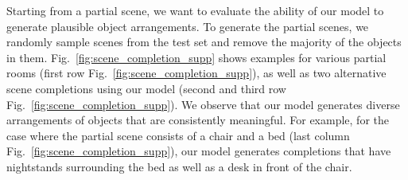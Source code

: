 \documentclass{article}
\newcommand{\figref}[1]{Fig.~\ref{#1}}
\begin{document}
Starting from a partial scene, we want to evaluate the ability of our model to
generate plausible object arrangements. To generate the partial scenes, we
randomly sample scenes from the test set and remove the majority of the objects
in them. \figref{fig:scene_completion_supp} shows examples for various partial
rooms (first row \figref{fig:scene_completion_supp}), as well as two
alternative scene completions using our model (second and third row
\figref{fig:scene_completion_supp}). We observe that our model generates
diverse arrangements of objects that are consistently meaningful. For example,
for the case where the partial scene consists of a chair and a bed (last column
\figref{fig:scene_completion_supp}), our model generates completions that have
nightstands surrounding the bed as well as a desk in front of the chair.
\end{document}
